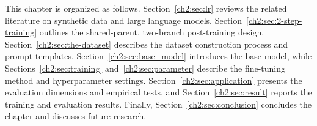 This chapter is organized as follows. Section~\ref{ch2:sec:lr} reviews the related literature on synthetic data and large language models. Section~\ref{ch2:sec:2-step-training} outlines the shared-parent, two-branch post-training design. Section~\ref{ch2:sec:the-dataset} describes the dataset construction process and prompt templates. Section~\ref{ch2:sec:base_model} introduces the base model, while Sections~\ref{ch2:sec:training} and~\ref{ch2:sec:parameter} describe the fine-tuning method and hyperparameter settings. Section~\ref{ch2:sec:application} presents the evaluation dimensions and empirical tests, and Section~\ref{ch2:sec:result} reports the training and evaluation results. Finally, Section~\ref{ch2:sec:conclusion} concludes the chapter and discusses future research.

